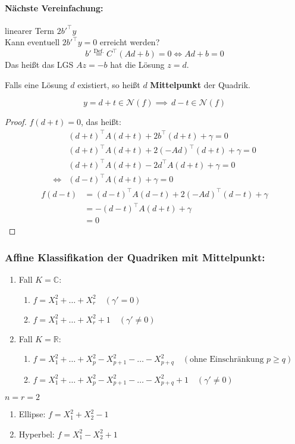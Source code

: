 \documentclass[parskip,a4paper,twoside,DIV15,BCOR12mm]{scrbook}
\begin{document}
\paragraph{Nächste Vereinfachung:}{linearer Term \(2b'^{\top}y\)\\
Kann eventuell \(2b'^{\top}y=0\) erreicht werden?
\[
b'\overset{\text{Def.}}{=}C^{\top}(Ad+b)=0\Longleftrightarrow Ad+b=0
\]
Das heißt das LGS \(Az=-b\) hat die Lösung \(z=d\).}
\begin{definition}
Falls eine Lösung \(d\) existiert, so heißt \(d\) \textbf{Mittelpunkt} der
Quadrik.
\end{definition}
\begin{note}
\[
y=d+t\in\mathcal{N}(f)\implies\,d-t\in\mathcal{N}(f)
\]
\end{note}
\begin{proof}
\(f(d+t)=0\), das heißt:
\begin{align*}
&(d+t)^{\top}A(d+t)+2b^{\top}(d+t)+\gamma=0\\
&(d+t)^{\top}A(d+t)+2(-Ad)^{\top}(d+t)+\gamma=0\\
&(d+t)^{\top}A(d+t)-2d^{\top}A(d+t)+\gamma=0\\
\Longleftrightarrow&(d-t)^{\top}A(d+t)+\gamma=0
\end{align*}
\begin{align*}
f(d-t)&=(d-t)^{\top}A(d-t)+2(-Ad)^{\top}(d-t)+\gamma\\
&=-(d-t)^{\top}A(d+t)+\gamma\\
&=0
\end{align*}
\end{proof}
\subsubsection{Affine Klassifikation der Quadriken mit Mittelpunkt:}
\begin{enumerate}
\item Fall \(K=\mathbb{C}\):
    \begin{enumerate}
    \item\(f=X_{1}^{2}+\ldots+X_{r}^{2}\quad(\gamma'=0)\)
    \item\(f=X_{1}^{2}+\ldots+X_{r}^{2}+1\quad(\gamma'\neq0)\)
    \end{enumerate}
\item Fall \(K=\mathbb{R}\):
    \begin{enumerate}
    \item\(f=X_{1}^{2}+\ldots+X_{p}^{2}-X_{p+1}^{2}-\ldots-X_{p+q}^{2}\quad
	(\text{ohne Einschränkung }p\geq q)\)
    \item\(f=X_{1}^{2}+\ldots+X_{p}^{2}-X_{p+1}^{2}-\ldots-X_{p+q}^{2}+1\quad
	(\gamma'\neq0)\)
    \end{enumerate}
\end{enumerate}
\begin{example}
\(n=r=2\)
\begin{enumerate}
\item Ellipse: \(f=X_{1}^{2}+X_{2}^{2}-1\)
\item Hyperbel: \(f=X_{1}^{2}-X_{2}^{2}+1\)
\end{enumerate}
\end{example}
\end{document}
